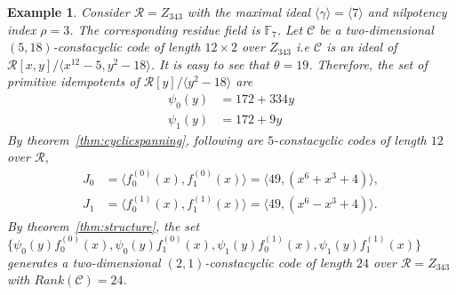 \documentclass[12pt,a4paper]{article}
\newtheorem{example}{Example}
\begin{document}
\begin{example}\label{ex:seventh}
    Consider $\mathcal{R}=Z_{343}$ with the maximal ideal $\langle\gamma\rangle=\langle7\rangle$ and nilpotency index $\rho=3$. The corresponding residue field is $\mathbb{F}_7$. Let $\mathscr{C}$ be a two-dimensional $(5,18)$-constacyclic code of length $12 \times 2$ over $Z_{343}$ i.e $\mathscr{C}$ is an ideal of $\mathcal{R}[x,y]/\langle x^{12}-5, y^2-18 \rangle$. It is easy to see that $\theta=19$. Therefore, the set of primitive idempotents of $\mathcal{R}[y]/\langle y^2-18 \rangle$ are
    \[
    \begin{aligned}
    \psi_0(y) &= 172 + 334y \\
    \psi_1(y) &= 172 + 9y
    \end{aligned}
    \]
    By theorem~\ref{thm:cyclicspanning}, following are $5$-constacyclic codes of length $12$ over $\mathcal{R}$,
    \[
    \begin{aligned}
    J_0 &= \langle f^{(0)}_0(x),f^{(0)}_1(x) \rangle = \langle 49,(x^6+x^3+4) \rangle, \\
    J_1 &= \langle f^{(1)}_0(x), f^{(1)}_1(x) \rangle = \langle 49,(x^6-x^3+4) \rangle.
    \end{aligned}
    \]
    By theorem~\ref{thm:structure}, the set $\{ \psi_0(y)f^{(0)}_0(x),\psi_0(y)f^{(0)}_1(x),\psi_1(y)f^{(1)}_0(x),\psi_1(y)f^{(1)}_1(x)\}$ generates a two-dimensional $(2,1)$-constacyclic code of length $24$ over $\mathcal{R}=Z_{343}$ with $Rank(\mathcal{C})=24$.
\end{example}
\end{document}
